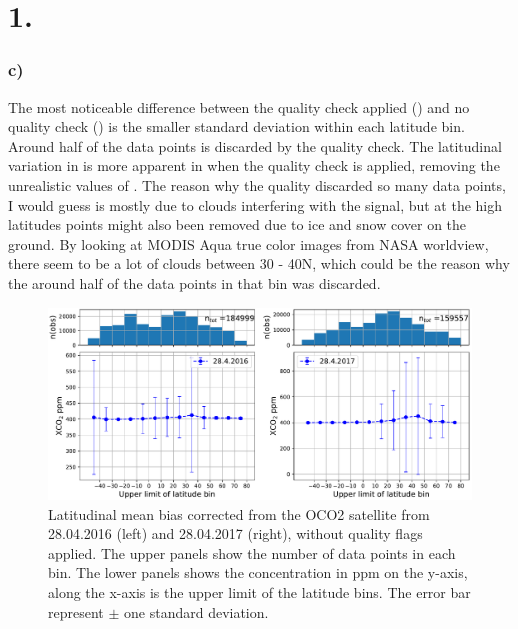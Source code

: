 \section*{1.}

\subsubsection*{c)}

The most noticeable difference between the quality check applied
() and no quality check ()
is the smaller standard deviation within each latitude bin. Around half of the
data points is discarded by the quality check. The latitudinal variation in
 is more apparent in when the quality check is applied, removing the
unrealistic values of . The reason why the quality discarded so many
data points, I would guess is mostly due to clouds interfering with the signal,
but at the high latitudes points might also been removed due to ice and snow
cover on the ground. By looking at MODIS Aqua true color images from NASA
worldview, there seem to be a lot of clouds between 30 - 40\degree N, which
could be the reason why the around half of the data points in that bin was
discarded.   
\begin{figure}[htbp]
    \includegraphics[width=\textwidth]{../xCO2.pdf}
    \centering
    \caption{Latitudinal mean  bias corrected  from the OCO2 satellite from 28.04.2016 (left) 
    and 28.04.2017 (right), without quality flags applied. The upper panels 
    show the number of data points in each bin. The lower panels shows the  
    concentration in ppm on the y-axis, along the x-axis is the upper limit of
    the latitude bins. The error bar represent $\pm$ one standard deviation.}
    \label{fig:no_qa_xco2}

\end{figure}

